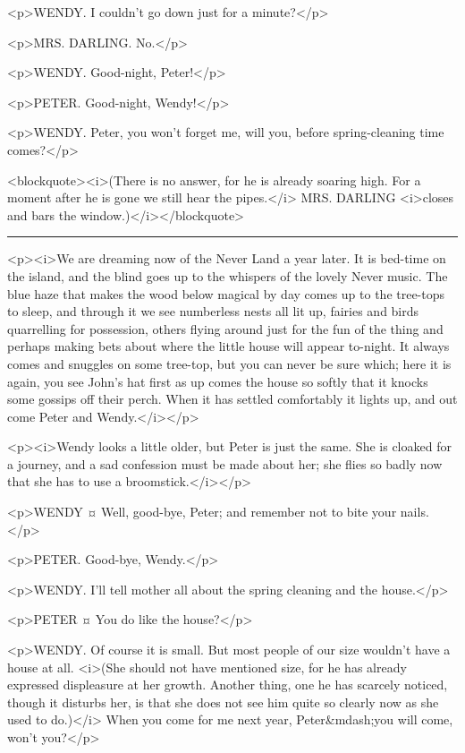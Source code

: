 <p>WENDY. I couldn't go down just for a minute?</p>

<p>MRS. DARLING. No.</p>

<p>WENDY. Good-night, Peter!</p>

<p>PETER. Good-night, Wendy!</p>

<p>WENDY. Peter, you won't forget me, will you, before spring-cleaning time comes?</p>

<blockquote><i>(There is no answer, for he is already soaring high. For a moment after he is gone we still hear the pipes.</i> MRS. DARLING <i>closes and bars the window.)</i></blockquote>

\plainbreak{1}

<p><i>We are dreaming now of the Never Land a year later. It is bed-time on the island, and the blind goes up to the whispers of the lovely Never music. The blue haze that makes the wood below magical by day comes up to the tree-tops to sleep, and through it we see numberless nests all lit up, fairies and birds quarrelling for possession, others flying around just for the fun of the thing and perhaps making bets about where the little house will appear to-night. It always comes and snuggles on some tree-top, but you can never be sure which; here it is again, you see John's hat first as up comes the house so softly that it knocks some gossips off their perch. When it has settled comfortably it lights up, and out come Peter and Wendy.</i></p>

<p><i>Wendy looks a little older, but Peter is just the same. She is cloaked for a journey, and a sad confession must be made about her; she flies so badly now that she has to use a broomstick.</i></p>

<p>WENDY ¤
Well, good-bye, Peter; and remember not to bite your nails.</p>

<p>PETER. Good-bye, Wendy.</p>

<p>WENDY. I'll tell mother all about the spring cleaning and the house.</p>

<p>PETER ¤
You do like the house?</p>

<p>WENDY. Of course it is small. But most people of our size wouldn't have a house at all. <i>(She should not have mentioned size, for he has already expressed displeasure at her growth. Another thing, one he has scarcely noticed, though it disturbs her, is that she does not see him quite so clearly now as she used to do.)</i> When you come for me next year, Peter&mdash;you will come, won't you?</p>

